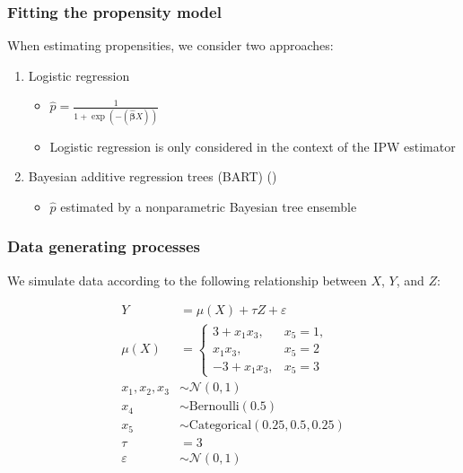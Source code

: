 \documentclass[compress]{beamer}
\begin{document}
\begin{frame} \frametitle{Fitting the propensity model}

When estimating propensities, we consider two approaches:

\begin{enumerate}
\item Logistic regression
\begin{itemize}
\item $\hat{p} = \frac{1}{1 + \exp(-(\hat{\mathbf{\beta}}X))}$
\item Logistic regression is only considered in the context of the IPW estimator
\end{itemize}
\item Bayesian additive regression trees (BART) (\cite{chipman2010bart})
\begin{itemize}
\item $\hat{p}$ estimated by a nonparametric Bayesian tree ensemble
\end{itemize}
\end{enumerate}

\end{frame}

\begin{frame} \frametitle{Data generating processes}
We simulate data according to the following relationship between $X$, $Y$, and $Z$:

\begin{align*}
Y &= \mu(X) + \tau Z + \varepsilon\\
\mu(X) &= 
\begin{cases}
3 + x_1 x_3,&  x_5 = 1,\\
x_1 x_3,&  x_5 = 2\\
-3 + x_1 x_3,&  x_5 = 3
\end{cases} \\
x_1, x_2, x_3 &\sim \mathcal{N}(0, 1)\\
x_4 &\sim \textrm{Bernoulli}(0.5)\\
x_5 &\sim \textrm{Categorical}(0.25, 0.5, 0.25)\\
\tau &= 3\\
\varepsilon &\sim \mathcal{N}(0, 1)\\
\end{align*}

\transboxin
\end{frame}
\end{document}
